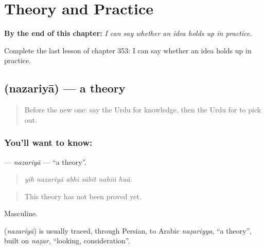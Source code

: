 
\chapter{Theory and Practice}
\label{ch:ur-theory-and-practice}

\begin{chapteropening}
\textbf{By the end of this chapter:} \emph{I can say whether an idea holds up in practice.}

Complete the last lesson of chapter 353: I can say whether an idea holds up in practice.
\end{chapteropening}

\section[\texorpdfstring{\ur{نظریہ} (nazariyā)}{نظریہ (nazariyā)}]{ (nazariyā) — a theory}

\label{lesson:UR-C353-nazariya}



\begin{quote}
Before the new one: say the Urdu for knowledge, then the Urdu for to pick out.
\end{quote}

\subsection*{You'll want to know: }
\textbf{} — \emph{nazariyā} — \textquotedblleft{}a theory\textquotedblright{}.

\begin{quote}
     
\end{quote}

\begin{quote}
\emph{yih nazariyā abhī sābit nahīṅ huā.}
\end{quote}

\begin{quote}
This theory has not been proved yet.
\end{quote}

Masculine.

\begin{cousinweb}
\textbf{} (\emph{nazariyā}) is usually traced, through Persian, to Arabic \emph{naẓariyya}, \textquotedblleft{}a theory\textquotedblright{}, built on \emph{naẓar}, \textquotedblleft{}looking, consideration\textquotedblright{}.
\end{cousinweb}

